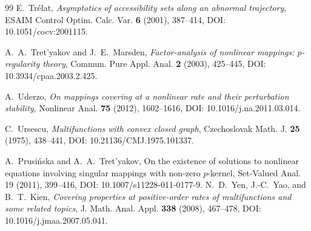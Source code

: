 \documentclass[11pt]{amsart}
\theoremstyle{definition}
\theoremstyle{remark}
\begin{document}
\begin{thebibliography}{99}
		E.~Tr\'elat,
		\emph{Asymptotics of accessibility sets along an abnormal trajectory},
		ESAIM Control Optim. Calc. Var. \textbf{6} (2001), 387--414,
		DOI: 10.1051/cocv:2001115.
		
		A.~A.~Tret'yakov and J.~E.~Marsden,
		\emph{Factor-analysis of nonlinear mappings: $p$-regularity theory},
		Commun. Pure Appl. Anal. \textbf{2} (2003), 425--445,
		DOI: 10.3934/cpaa.2003.2.425.
		
		A.~Uderzo,
		\emph{On mappings covering at a nonlinear rate and their perturbation
			stability},
		Nonlinear Anal. \textbf{75} (2012), 1602--1616,
		DOI: 10.1016/j.na.2011.03.014.
		
		C.~Ursescu,
		\emph{Multifunctions with convex closed graph},
		Czechoslovak Math. J. \textbf{25} (1975), 438--441,
		DOI: 10.21136/CMJ.1975.101337.
		
		A.~Prusińska and A.~A.~Tret'yakov,
		On the existence of solutions to nonlinear equations involving singular mappings with non-zero $p$-kernel,
		Set-Valued Anal. 19 (2011), 399--416,
		DOI: 10.1007/s11228-011-0177-9.
		N.~D.~Yen, J.-C.~Yao, and B.~T.~Kien,
		\emph{Covering properties at positive-order rates of multifunctions and
			some related topics},
		J. Math. Anal. Appl. \textbf{338} (2008), 467--478,
		DOI: 10.1016/j.jmaa.2007.05.041.
		
	\end{thebibliography}
	
\end{document}
